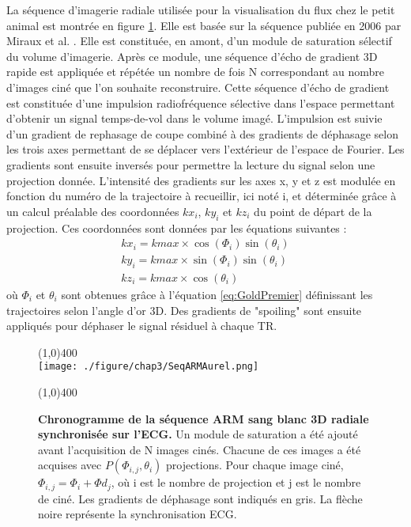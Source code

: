 La séquence d’imagerie radiale utilisée pour la visualisation du flux chez le petit animal est montrée en figure \ref{fig:SeqARMAurel}. Elle est basée sur la séquence publiée en 2006 par Miraux et al. \cite{Miraux:2006fu}. Elle est constituée, en amont, d'un module de saturation sélectif du volume d'imagerie. Après ce module, une séquence d'écho de gradient 3D rapide est appliquée et répétée un nombre de fois N correspondant au nombre d'images ciné que l'on souhaite reconstruire. Cette séquence d'écho de gradient est constituée d'une impulsion radiofréquence sélective dans l'espace permettant d'obtenir un signal temps-de-vol dans le volume imagé. L'impulsion est suivie d'un gradient de rephasage de coupe combiné à des gradients de déphasage selon les trois axes permettant de se déplacer vers l'extérieur de l'espace de Fourier. Les gradients sont ensuite inversés pour permettre la lecture du signal selon une projection donnée. 
L'intensité des gradients sur les axes x, y et z est modulée en fonction du numéro de la trajectoire à recueillir, ici noté i, et déterminée grâce à un calcul préalable des coordonnées $kx_i$, $ky_i$ et $kz_i$ du point de départ de la projection. Ces coordonnées sont données par les équations suivantes :
\begin{equation}
\label{eq:GoldSecond}
\begin{array}{c}
kx_i = kmax \times \cos(\Phi_i) \sin(\theta_i) \\
ky_i = kmax \times \sin(\Phi_i) \sin(\theta_i) \\
kz_i = kmax \times \cos(\theta_i)
\end{array}
\end{equation}
où $\Phi_i$ et $\theta_i$ sont obtenues grâce à l'équation \ref{eq:GoldPremier} définissant les trajectoires selon l'angle d'or 3D. Des gradients de "spoiling" sont ensuite appliqués pour déphaser le signal résiduel à chaque TR.

\begin{figure}[H]
\centering \line(1,0){400} \\
\texttt{[image: ./figure/chap3/SeqARMAurel.png]}
\caption[Chronogramme de la séquence ARM sang blanc 3D radiale synchronisée sur l'ECG.]{\label{fig:SeqARMAurel}\textbf{ Chronogramme de la séquence ARM sang blanc 3D radiale synchronisée sur l'ECG.} Un module de saturation a été ajouté avant l'acquisition de N images cinés. Chacune de ces images a été acquises avec $P(\Phi_{i,j},\theta_i)$ projections. Pour chaque image ciné, $\Phi_{i,j} = \Phi_i+\Phi d_j$, où i est le nombre de projection et j est le nombre de ciné. Les gradients de déphasage sont indiqués en gris. La flèche noire représente la synchronisation ECG.}
\line(1,0){400} \\ \end{figure}

